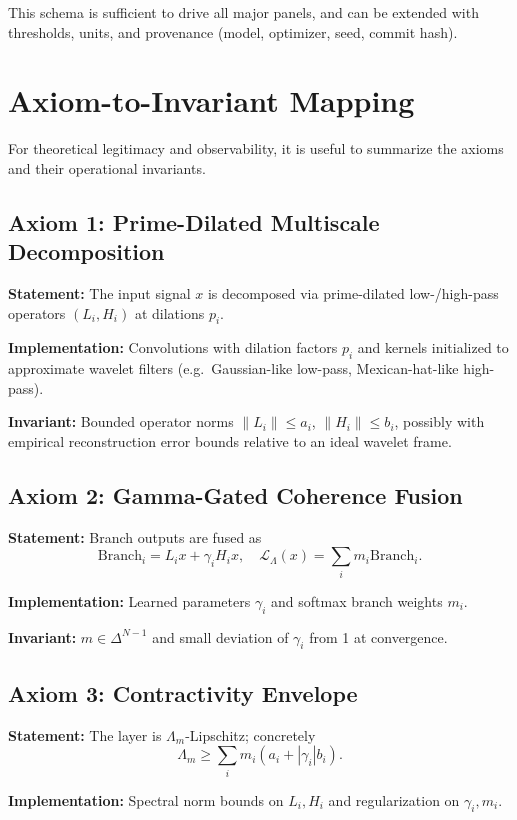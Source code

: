 \documentclass[11pt]{article}
\begin{document}
This schema is sufficient to drive all major panels, and can be extended with thresholds, units, and provenance (model, optimizer, seed, commit hash).

\section{Axiom-to-Invariant Mapping}

For theoretical legitimacy and observability, it is useful to summarize the axioms and their operational invariants.

\subsection*{Axiom 1: Prime-Dilated Multiscale Decomposition}

\textbf{Statement:} The input signal $x$ is decomposed via prime-dilated low-/high-pass operators $(L_i,H_i)$ at dilations $p_i$.

\textbf{Implementation:} Convolutions with dilation factors $p_i$ and kernels initialized to approximate wavelet filters (e.g.\ Gaussian-like low-pass, Mexican-hat-like high-pass).

\textbf{Invariant:} Bounded operator norms $\|L_i\| \le a_i$, $\|H_i\| \le b_i$, possibly with empirical reconstruction error bounds relative to an ideal wavelet frame.

\subsection*{Axiom 2: Gamma-Gated Coherence Fusion}

\textbf{Statement:} Branch outputs are fused as
\[
  \mathrm{Branch}_i = L_i x + \gamma_i H_i x, \quad
  \mathcal{L}_\Lambda(x) = \sum_i m_i \mathrm{Branch}_i.
\]

\textbf{Implementation:} Learned parameters $\gamma_i$ and softmax branch weights $m_i$.

\textbf{Invariant:} $m \in \Delta^{N-1}$ and small deviation of $\gamma_i$ from 1 at convergence.

\subsection*{Axiom 3: Contractivity Envelope}

\textbf{Statement:} The layer is $\Lambda_m$-Lipschitz; concretely
\[
  \Lambda_m \ge \sum_i m_i(a_i + |\gamma_i|b_i).
\]

\textbf{Implementation:} Spectral norm bounds on $L_i,H_i$ and regularization on $\gamma_i,m_i$.
\end{document}
